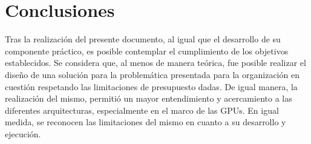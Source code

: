 \documentclass[conference,onecolumn]{IEEEtran}
\begin{document}
\section{Conclusiones}
Tras la realización del presente documento, al igual que el desarrollo de su componente práctico, es posible contemplar el cumplimiento de los objetivos establecidos. Se considera que, al menos de manera teórica, fue posible realizar el diseño de una solución para la problemática presentada para la organización en cuestión respetando las limitaciones de presupuesto dadas. De igual manera, la realización del mismo, permitió un mayor entendimiento y acercamiento a las diferentes arquitecturas, especialmente en el marco de las GPUs. En igual medida, se reconocen las limitaciones del mismo en cuanto a su desarrollo y ejecución.





{
    
    \label{insert:cot}
}
\end{document}
